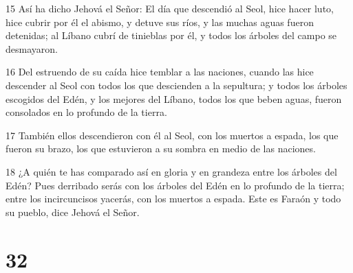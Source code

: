 \par 15 Así ha dicho Jehová el Señor: El día que descendió al Seol, hice hacer luto, hice cubrir por él el abismo, y detuve sus ríos, y las muchas aguas fueron detenidas; al Líbano cubrí de tinieblas por él, y todos los árboles del campo se desmayaron.
\par 16 Del estruendo de su caída hice temblar a las naciones, cuando las hice descender al Seol con todos los que descienden a la sepultura; y todos los árboles escogidos del Edén, y los mejores del Líbano, todos los que beben aguas, fueron consolados en lo profundo de la tierra.
\par 17 También ellos descendieron con él al Seol, con los muertos a espada, los que fueron su brazo, los que estuvieron a su sombra en medio de las naciones. 
\par 18 ¿A quién te has comparado así en gloria y en grandeza entre los árboles del Edén? Pues derribado serás con los árboles del Edén en lo profundo de la tierra; entre los incircuncisos yacerás, con los muertos a espada. Este es Faraón y todo su pueblo, dice Jehová el Señor.

\chapter{32}

